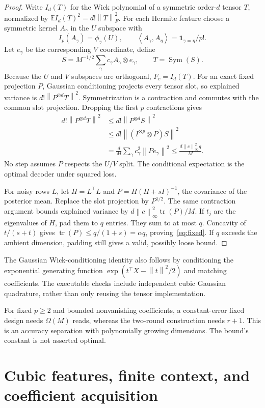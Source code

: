 \documentclass[11pt]{article}
\newcommand{\E}{\mathbb E}
\newcommand{\tr}{\operatorname{tr}}
\newcommand{\Sym}{\operatorname{Sym}}
\newcommand{\norm}[1]{\left\lVert#1\right\rVert}
\newcommand{\ip}[2]{\left\langle#1,#2\right\rangle}
\begin{document}
\begin{proof}
Write $I_d(T)$ for the Wick polynomial of a symmetric order-$d$ tensor $T$, normalized by $\E I_d(T)^2=d!\norm{T}_F^2$. For each Hermite feature choose a symmetric kernel $A_\gamma$ in the $U$ subspace with
\[
I_p(A_\gamma)=\phi_\gamma(U),\qquad
\ip{A_\gamma}{A_\eta}=\mathbf1_{\gamma=\eta}/p!.
\]
Let $e_\gamma$ be the corresponding $V$ coordinate, define
\[
S=M^{-1/2}\sum_\gamma c_\gamma A_\gamma\otimes e_\gamma,
\qquad T=\Sym(S).
\]
Because the $U$ and $V$ subspaces are orthogonal, $F_c=I_d(T)$. For an exact fixed projection $P$, Gaussian conditioning projects every tensor slot, so explained variance is $d!\norm{P^{\otimes d}T}^2$. Symmetrization is a contraction and commutes with the common slot projection. Dropping the first $p$ contractions gives
\begin{align*}
d!\norm{P^{\otimes d}T}^2
&\le d!\norm{P^{\otimes d}S}^2\\
&\le d!\norm{(I^{\otimes p}\otimes P)S}^2\\
&=\frac dM\sum_\gamma c_\gamma^2\norm{Pe_\gamma}^2
\le\frac{d\norm{c}_\infty^2q}{M}.
\end{align*}
No step assumes $P$ respects the $U/V$ split. The conditional expectation is the optimal decoder under squared loss.

For noisy rows $L$, let $H=L^\top L$ and $P=H(H+sI)^{-1}$, the covariance of the posterior mean. Replace the slot projection by $P^{1/2}$. The same contraction argument bounds explained variance by $d\norm{c}_\infty^2\tr(P)/M$. If $t_j$ are the eigenvalues of $H$, pad them to $q$ entries. They sum to at most $q$. Concavity of $t/(s+t)$ gives $\tr(P)\le q/(1+s)=\alpha q$, proving~\eqref{eq:fixed}. If $q$ exceeds the ambient dimension, padding still gives a valid, possibly loose bound.
\end{proof}

The Gaussian Wick-conditioning identity also follows by conditioning the exponential generating function $\exp(t^\top X-\norm{t}^2/2)$ and matching coefficients. The executable checks include independent cubic Gaussian quadrature, rather than only reusing the tensor implementation.

For fixed $p\ge2$ and bounded nonvanishing coefficients, a constant-error fixed design needs $\Omega(M)$ reads, whereas the two-round construction needs $r+1$. This is an accuracy separation with polynomially growing dimensions. The bound's constant is not asserted optimal.

\section{Cubic features, finite context, and coefficient acquisition}
\end{document}
